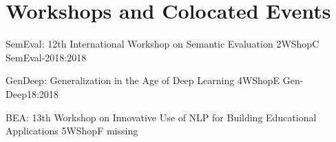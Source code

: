 \chapter[Workshops and Colocated Events: \daydate]{Workshops and Colocated Events}
\thispagestyle{emptyheader}
\vfill







\begin{wsschedule}
  {SemEval: 12th International Workshop on Semantic Evaluation}
  {2}{WShopC}
{SemEval-2018:2018}
  {\WShopLocC}
  
\end{wsschedule}




\begin{wsschedule}
  {GenDeep: Generalization in the Age of Deep Learning}
  {4}{WShopE}
  {Gen-Deep18:2018}
  {\WShopLocE}
  
\end{wsschedule}

\begin{wsschedule}
  {BEA: 13th Workshop on Innovative Use of NLP for Building Educational Applications}
  {5}{WShopF}
  {missing}
  {\WShopLocF}
  
\end{wsschedule}

